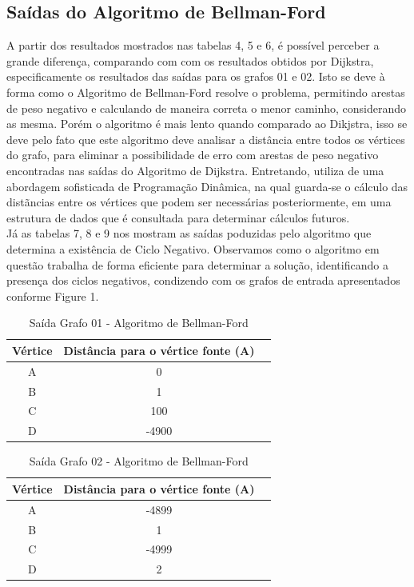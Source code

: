 \documentclass[12pt]{article}
\begin{document}
\subsection{Saídas do Algoritmo de Bellman-Ford}
A partir dos resultados mostrados nas tabelas 4, 5 e 6, é possível perceber a grande diferença, comparando com com os resultados obtidos por Dijkstra, especificamente os resultados das saídas para  os grafos 01 e 02. Isto se deve à forma como o Algoritmo de Bellman-Ford resolve o problema, permitindo arestas de peso  negativo e calculando de maneira correta o menor caminho, considerando as mesma. Porém o   algoritmo é mais lento quando comparado ao Dikjstra, isso se deve pelo  fato que este algoritmo deve  analisar a distância entre todos os vértices do grafo, para eliminar a possibilidade de erro com arestas de peso negativo encontradas nas saídas do Algoritmo de Dijkstra. Entretando, utiliza de uma abordagem sofisticada de Programação Dinâmica, na qual guarda-se o cálculo das distãncias entre os vértices que podem ser necessárias  posteriormente, em uma estrutura de dados que é consultada para determinar cálculos  futuros.\\
Já as tabelas 7, 8 e 9 nos mostram as saídas poduzidas pelo algoritmo que determina a   existência de Ciclo Negativo. Observamos  como o algoritmo em questão trabalha de forma eficiente para determinar a solução, identificando a presença dos ciclos negativos, condizendo com os grafos de entrada apresentados  conforme Figure 1.

\begin{table}[h!]
  \centering
  \caption{Saída Grafo 01 - Algoritmo de Bellman-Ford}
  \label{tab:table1}
  \begin{tabular}{ccc}
    \toprule
    Vértice & Distância para o vértice fonte (A)\\
    \midrule
    A & 0\\
    B & 1\\
    C & 100\\
   D & -4900\\
    \bottomrule
  \end{tabular}
\end{table}

\begin{table}[h!]
  \centering
  \caption{Saída Grafo 02 - Algoritmo de Bellman-Ford}
  \label{tab:table1}
  \begin{tabular}{ccc}
    \toprule
    Vértice & Distância para o vértice fonte (A)\\
    \midrule
    A & -4899\\
    B & 1\\
    C & -4999\\
   D & 2\\
    \bottomrule
  \end{tabular}
\end{table}
\end{document}
